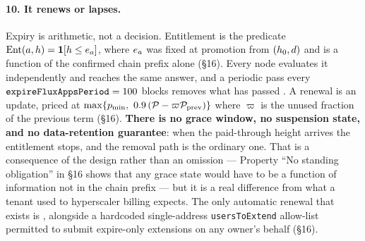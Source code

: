 \paragraph{10. It renews or lapses.}
Expiry is arithmetic, not a decision. Entitlement is the predicate
$\mathrm{Ent}(a,h) = \mathbf{1}\!\left[h \le e_{a}\right]$, where $e_{a}$ was fixed at promotion from
$(h_0, d)$ and is a function of the confirmed chain prefix alone (\S16). Every node evaluates
it independently and reaches the same answer, and a periodic pass every
$\texttt{expire\allowbreak{}Flux\allowbreak{}Apps\allowbreak{}Period} = 100$ blocks removes what has passed
. A renewal is an update, priced at
$\max\{p_{\min},\ 0.9\,(\mathcal{P} - \varpi\mathcal{P}_{\mathrm{prev}})\}$ where $\varpi$ is the unused fraction
of the previous term (\S16). \textbf{There is no grace window, no suspension state, and no
data-retention guarantee}: when the paid-through height arrives the entitlement stops, and the
removal path is the ordinary one. That is a consequence of the design rather than an omission ---
Property ``No standing obligation'' in \S16 shows that any grace state would have to be a function of
information not in the chain prefix --- but it is a real difference from what a tenant used to
hyperscaler billing expects. The only automatic renewal that exists is
, alongside a hardcoded single-address \texttt{usersToExtend} allow-list
permitted to submit expire-only extensions on any owner's behalf (\S16).

